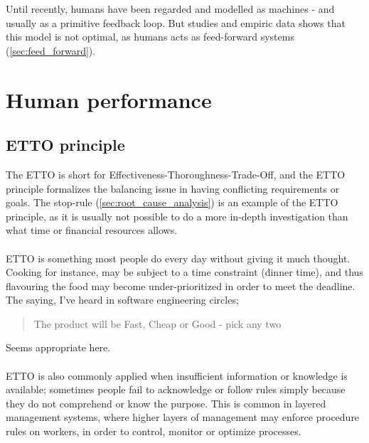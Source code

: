 Until recently, humans have been regarded and modelled as machines - and usually as a primitive feedback loop. But studies and empiric data shows that this model is not optimal, as humans acts as feed-forward systems (\ref{sec:feed_forward}).

\section{Human performance}
\label{sec:human_performance}



\subsection{ETTO principle}
\label{sec:etto_principle	}
The ETTO is short for Effectiveness-Thoroughness-Trade-Off, and the ETTO principle formalizes the balancing issue in having conflicting requirements or goals. The stop-rule (\ref{sec:root_cause_analysis}) is an example of the ETTO principle, as it is usually not possible to do a more in-depth investigation than what time or financial resources allows.\\
\\
ETTO is something most people do every day without giving it much thought. Cooking for instance, may be subject to a time constraint (dinner time), and thus flavouring the food may become under-prioritized in order to meet the deadline. The saying, I've heard in software engineering circles;
 \begin{quote}
 The product will be Fast, Cheap or Good - pick any two
\end{quote}
Seems appropriate here.\\
\\
ETTO is also commonly applied when insufficient information or knowledge is available; sometimes people fail to acknowledge or follow rules simply because they do not comprehend or know the purpose. This is common in layered management systems, where higher layers of management may enforce procedure rules on workers, in order to control, monitor or optimize processes.

